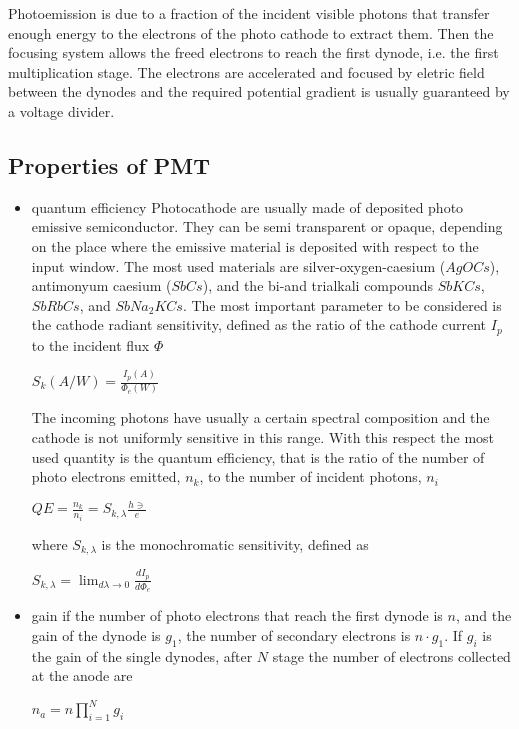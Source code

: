 Photoemission is due to a fraction of the incident visible photons that transfer enough energy to the electrons of the photo cathode to extract them.
Then the focusing system allows the freed electrons to reach the first dynode, i.e. the first multiplication stage. The electrons are accelerated and focused by eletric field between the dynodes and the required potential gradient is usually guaranteed by a voltage divider.


\subsection{Properties of PMT}
\begin{itemize}
\item quantum efficiency
Photocathode are usually made of deposited photo emissive semiconductor. They can be semi transparent or opaque, depending on the place where the emissive material is deposited with respect to the input window.
The most used materials are silver-oxygen-caesium ($AgOCs$), antimonyum caesium ($SbCs$), and the bi-and trialkali compounds $SbKCs$, $SbRbCs$, and $SbNa_{2}KCs$. The most important parameter to be considered is the cathode radiant sensitivity, defined as the ratio of the cathode current $I_{p}$ to the incident flux $\Phi$

$S_{k}(A/W)=\frac{I_{p}(A)}{\Phi _{e}(W)}$

The incoming photons have usually a certain spectral composition and the cathode is not uniformly sensitive in this range. With this respect the most used quantity is the quantum efficiency, that is the ratio of the number of photo electrons emitted, $n_{k}$, to the number of incident photons, $n_{i}$

$QE = \frac{n_{k}}{n_{i}} = S_{k, \lambda} \frac{h\ni}{e}$

where $S_{k, \lambda}$ is the monochromatic sensitivity, defined as

$S_{k, \lambda} = \lim_{d\lambda \to 0}\frac{dI_{p}}{d\Phi _{e}}$


\item gain
if the number of photo electrons that reach the first dynode is $n$, and the gain of the dynode is $g_{1}$, the number of secondary electrons is $n\cdot g_{1}$. If $g_{i}$ is the gain of the single dynodes, after $N$ stage the number of electrons collected at the anode are

$n_{a} = n\prod_{i=1}^N g_i$


\end{itemize}
